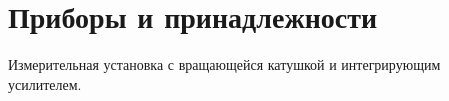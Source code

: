 \section*{Приборы и принадлежности}

Измерительная установка с вращающейся катушкой и
интегрирующим усилителем. 
